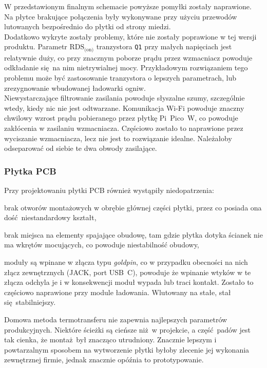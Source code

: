 \documentclass[polish]{aghengthesis}
\let\tempone\itemize
\let\temptwo\enditemize
\renewenvironment{itemize}{\tempone\setlength{\itemsep}{0cm}}{\temptwo}
\begin{document}
				W przedstawionym finalnym schemacie powyższe pomyłki zostały naprawione. Na płytce brakujące połączenia były wykonywane przy użyciu przewodów lutowanych bezpośrednio do płytki od strony miedzi.
				$ $\\
				
				Dodatkowo wykryte zostały problemy, które nie zostały poprawione w tej wersji produktu. Parametr $\text{RDS}_{\text{(on)}}$ tranzystora \lstinline|Q1| przy małych napięciach jest relatywnie duży, co przy znacznym poborze prądu przez wzmacniacz powoduje odkładanie się na nim nietrywialnej mocy. Przykładowym rozwiązaniem tego problemu może być zastosowanie tranzystora o lepszych parametrach, lub zrezygnowanie wbudowanej ładowarki ogniw.
				$ $\\
				
				Niewystarczające filtrowanie zasilania powoduje słyszalne szumy, szczególnie wtedy, kiedy nic nie jest odtwarzane. Komunikacja Wi-Fi powoduje znaczny chwilowy wzrost prądu pobieranego przez płytkę Pi~Pico~W, co powoduje zakłócenia w zasilaniu wzmacniacza. Częściowo zostało to naprawione przez wyciszanie wzmacniacza, lecz nie jest to rozwiązanie idealne. Należałoby odseparować od siebie te dwa obwody zasilające.
				
			\subsubsection{Płytka PCB}
				Przy projektowaniu płytki PCB również wystąpiły niedopatrzenia:
				\begin{itemize}
					\item brak otworów montażowych w obrębie głównej części płytki, przez co posiada ona dość niestandardowy kształt,
					\item brak miejsca na elementy spajające obudowę, tam gdzie płytka dotyka ścianek nie ma wkrętów mocujących, co powoduje niestabilność obudowy,
					\item moduły są wpinane w złącza typu \textit{goldpin}, co w przypadku obecności na nich złącz zewnętrznych (JACK, port USB~C), powoduje że wpinanie wtyków w te złącza odchyla je i w konsekwencji moduł wypada lub traci kontakt. Zostało to częściowo naprawione przy module ładowania. Wlutowany na stałe, stał się stabilniejszy.
				\end{itemize}
				
				Domowa metoda termotransferu nie zapewnia najlepszych parametrów produkcyjnych. Niektóre ścieżki są cieńsze niż w projekcie, a część padów jest tak cienka, że montaż był znacząco utrudniony. Znacznie lepszym i powtarzalnym sposobem na wytworzenie płytki byłoby zlecenie jej wykonania zewnętrznej firmie, jednak znacznie opóźnia to prototypowanie.
		
\end{document}
